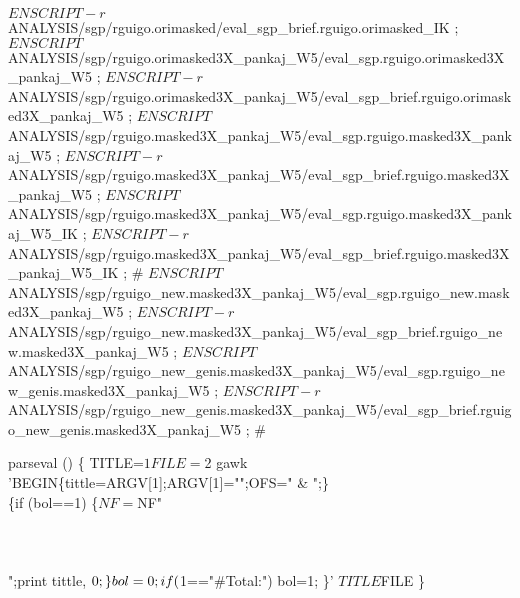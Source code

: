 \documentclass[11pt]{article}
\def\nwendcode{\endtrivlist \endgroup} %
\let\nwdocspar=\par                    %
\begin{document}
$ENSCRIPT -r $ANALYSIS/sgp/rguigo.orimasked/eval_sgp_brief.rguigo.orimasked_IK ;
$ENSCRIPT $ANALYSIS/sgp/rguigo.orimasked3X_pankaj_W5/eval_sgp.rguigo.orimasked3X_pankaj_W5 ;
$ENSCRIPT -r $ANALYSIS/sgp/rguigo.orimasked3X_pankaj_W5/eval_sgp_brief.rguigo.orimasked3X_pankaj_W5 ;
$ENSCRIPT $ANALYSIS/sgp/rguigo.masked3X_pankaj_W5/eval_sgp.rguigo.masked3X_pankaj_W5 ;
$ENSCRIPT -r $ANALYSIS/sgp/rguigo.masked3X_pankaj_W5/eval_sgp_brief.rguigo.masked3X_pankaj_W5 ;
$ENSCRIPT $ANALYSIS/sgp/rguigo.masked3X_pankaj_W5/eval_sgp.rguigo.masked3X_pankaj_W5_IK ;
$ENSCRIPT -r $ANALYSIS/sgp/rguigo.masked3X_pankaj_W5/eval_sgp_brief.rguigo.masked3X_pankaj_W5_IK ;
#
$ENSCRIPT $ANALYSIS/sgp/rguigo_new.masked3X_pankaj_W5/eval_sgp.rguigo_new.masked3X_pankaj_W5 ;
$ENSCRIPT -r $ANALYSIS/sgp/rguigo_new.masked3X_pankaj_W5/eval_sgp_brief.rguigo_new.masked3X_pankaj_W5 ;
$ENSCRIPT $ANALYSIS/sgp/rguigo_new_genis.masked3X_pankaj_W5/eval_sgp.rguigo_new_genis.masked3X_pankaj_W5 ;
$ENSCRIPT -r $ANALYSIS/sgp/rguigo_new_genis.masked3X_pankaj_W5/eval_sgp_brief.rguigo_new_genis.masked3X_pankaj_W5 ;
#
\nwendcode{}\nwdocspar
\nwenddocs{}\endmoddef
parseval ()
\{
   TITLE=$1
   FILE=$2
   gawk 'BEGIN\{tittle=ARGV[1];ARGV[1]="";OFS=" & ";\}\\
         \{if (bol==1) \{$NF=$NF" \\\\\\\\";print tittle, $0;\} bol=0 ; \\
         if ($1=="#Total:") bol=1; \}' $TITLE $FILE
\}
\end{document}

